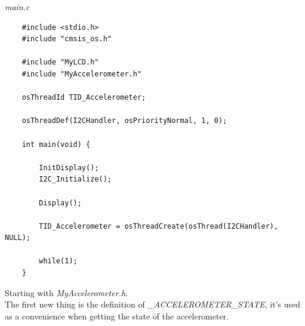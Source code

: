 \documentclass{article}
\begin{document}
\vspace{2mm}
\textit{main.c}
\begin{lstlisting}
    #include <stdio.h>
    #include "cmsis_os.h"

    #include "MyLCD.h"
    #include "MyAccelerometer.h"

    osThreadId TID_Accelerometer;

    osThreadDef(I2CHandler, osPriorityNormal, 1, 0);

    int main(void) {
        
        InitDisplay();
        I2C_Initialize();
        
        Display();
        
        TID_Accelerometer = osThreadCreate(osThread(I2CHandler), NULL);
        
        while(1);
    }
\end{lstlisting}

\vspace{2mm}
Starting with \textit{MyAccelerometer.h}.\\
The first new thing is the definition of \textit{\_ACCELEROMETER\_STATE}, it's
used as a convenience when getting the state of the accelerometer.
\end{document}
